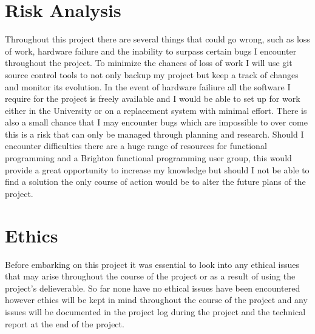 \documentclass{report}
\begin{document}
\section{Risk Analysis}
Throughout this project there are several things that could go wrong, such as  loss of work, hardware failure and the inability to surpass certain bugs I encounter throughout the project. To minimize the chances of loss of work I will use git source control tools to not only backup my project but keep a track of changes and monitor its evolution. In the event of hardware failiure all the software I require for the project is freely available and I would be able to set up for work either in the University or on a replacement system with minimal effort. There is also a small chance that I may encounter bugs which are impossible to over come this is a risk that can only be managed through planning and research. Should I encounter difficulties there are a huge range of resources for functional programming and a Brighton functional programming user group, this would provide a great opportunity to increase my knowledge but should I not be able to find a solution the only course of action would be to alter the future plans of the project.

\section{Ethics}
Before embarking on this project it was essential to look into any ethical issues that may arise throughout the course of the project or as a result of using the project's delieverable. 
So far none have no ethical issues have been encountered however ethics  will be kept in mind throughout the course of the project and any issues will be documented in the project log during the project and the technical report at the end of the project. 




%



\end{document}
